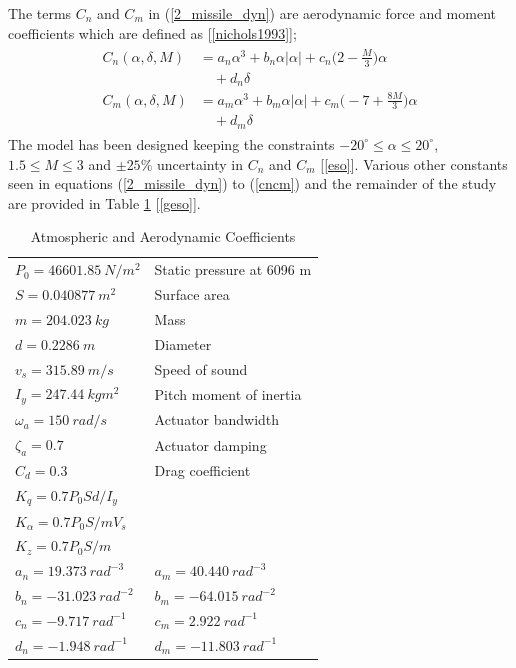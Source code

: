 \documentclass[conference]{IEEEtran}
\begin{document}
	The terms $C_n$ and $C_m$ in (\ref{2_missile_dyn}) are aerodynamic force and moment coefficients which are defined as [\ref{nichols1993}];
	\begin{eqnarray}
		\begin{aligned}
		 \label{cncm}
			C_n(\alpha,\delta,M)&=a_n\alpha^3+b_n\alpha|\alpha|+c_n\Big(2-\frac{M}{3}\Big)\alpha \\ 
			&\quad+ d_n\delta \\
			C_m(\alpha,\delta,M)&=a_m\alpha^3+b_m\alpha|\alpha|+ c_m\Big(-7+\frac{8M}{3}\Big) \alpha 
			\\&\quad+d_m \delta
		\end{aligned}
	\end{eqnarray} 
	The model has been designed keeping the constraints $-20^\circ\le \alpha \le20^\circ$, $1.5 \le M \le 3$ and $\pm25\%$ uncertainty in $C_n$ and $C_m$ [{\ref{eso}}]. Various other constants seen in equations (\ref{2_missile_dyn}) to (\ref{cncm}) and the remainder of the study are provided in Table \ref{constants_table} [\ref{geso}].
	\begin{table}[htbp]
		\centering
		\caption{Atmospheric and Aerodynamic Coefficients}
		\label{constants_table}	
		\begin{tabular}{ll}		
			\hline
			$P_0 = 46601.85 ~ N/m^2$ 		& \textmd{Static pressure at 6096 m} \\
			$S = 0.040877 ~ m^2$ 			& \textmd{Surface area} \\
			$m = 204.023 ~ kg$				& \textmd{Mass} \\
			$d = 0.2286 ~ m$				& \textmd{Diameter} \\
			$v_s = 315.89 ~ m/s$ 			& \textmd{Speed of sound} \\
			$I_y = 247.44 ~ kgm^2$			& \textmd{Pitch moment of inertia} \\
			$\omega_a = 150 ~ rad/s$ 		& \textmd{Actuator bandwidth} \\
			$\zeta_a = 0.7$					& \textmd{Actuator damping} \\
			$C_d = 0.3$						& \textmd{Drag coefficient} \\						
			$K_q = 0.7P_0Sd/I_y$			& \textmd{} \\	
			$K_\alpha = 0.7P_0S/mV_s$		& \textmd{} \\
			$K_z = 0.7P_0S/m$				& \textmd{} \\
			$a_n = 19.373 ~ rad^{-3}$		& $a_m = 40.440 ~ rad^{-3}$ \\
			$b_n = -31.023 ~ rad^{-2}$		& $b_m = -64.015 ~ rad^{-2}$ \\
			$c_n = -9.717 ~ rad^{-1}$		& $c_m = 2.922 ~ rad^{-1}$ \\
			$d_n = -1.948 ~ rad^{-1}$		& $d_m = -11.803 ~ rad^{-1}$ \\
			\hline
		\end{tabular}
	\end{table}
\end{document}
